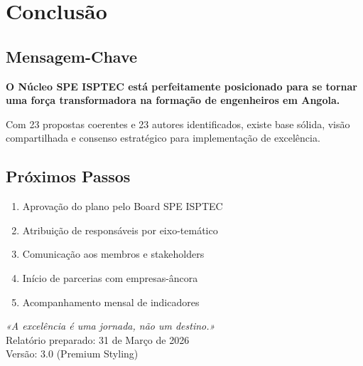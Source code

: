 \documentclass[12pt,a4paper,oneside]{article}
\begin{document}
\newpage

\section*{Conclusão}

\subsection*{Mensagem-Chave}

\noindent\colorbox{caixa-amarelo}{%
\begin{minipage}{\textwidth}

\textbf{\color{spe-primary}O Núcleo SPE ISPTEC está perfeitamente posicionado para se tornar uma força transformadora na formação de engenheiros em Angola.}

\medskip

Com 23 propostas coerentes e 23 autores identificados, existe base sólida, visão compartilhada e consenso estratégico para implementação de excelência.

\end{minipage}%
}

\vspace{2cm}

\subsection*{Próximos Passos}

\begin{enumerate}
  \item Aprovação do plano pelo Board SPE ISPTEC
  \item Atribuição de responsáveis por eixo-temático
  \item Comunicação aos membros e stakeholders
  \item Início de parcerias com empresas-âncora
  \item Acompanhamento mensal de indicadores
\end{enumerate}

\vspace{2cm}

\begin{center}
\small
\color{spe-secondary}
\textit{«A excelência é uma jornada, não um destino.»}\\[0.8cm]
Relatório preparado: 31 de Março de 2026\\
Versão: 3.0 (Premium Styling)
\end{center}
\end{document}
